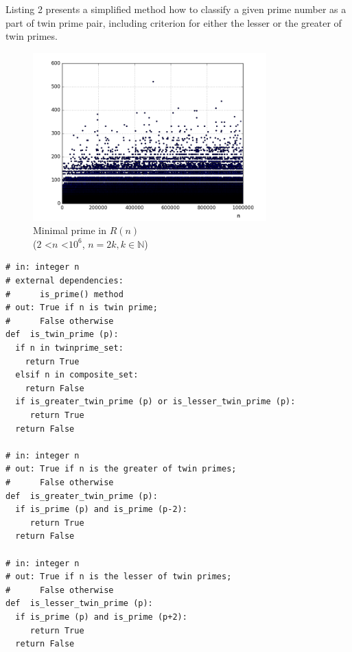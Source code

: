 \documentclass[10pt,twocolumn]{article}
\begin{document}
Listing 2 presents a simplified method how to classify a given prime number as a part of twin prime pair, including criterion for either the lesser or the greater of twin primes.

\begin{figure}[!ht]
\centering
\captionsetup{justification=centering}
\includegraphics[width=9cm]{f_min_prime_in_sum}
\caption{Minimal prime in $R(n)$ \\ ($2$ \textless $n$ \textless $10^6$, $n = 2k, k \in \mathbb{N}$)}
\label{fig:minprime}
\end{figure}

\lstset{language=Python}
\lstset{breaklines=true}
\lstset{frame=shadowbox}
\begin{lstlisting}[linewidth=8.7cm]
# in: integer n
# external dependencies:
#      is_prime() method
# out: True if n is twin prime; 
#      False otherwise
def  is_twin_prime (p):
  if n in twinprime_set:
    return True
  elsif n in composite_set:
    return False
  if is_greater_twin_prime (p) or is_lesser_twin_prime (p):
     return True
  return False

# in: integer n
# out: True if n is the greater of twin primes;
#      False otherwise
def  is_greater_twin_prime (p):
  if is_prime (p) and is_prime (p-2):
     return True
  return False
  
# in: integer n
# out: True if n is the lesser of twin primes; 
#      False otherwise
def  is_lesser_twin_prime (p):
  if is_prime (p) and is_prime (p+2):
     return True
  return False
\end{lstlisting}
\end{document}
